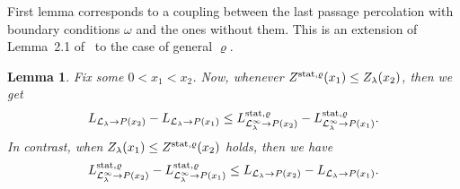 \documentclass[12pt,a4paper]{article}
\numberwithin{equation}{section}
\newtheorem{lem}[prop]{Lemma}
\begin{document}
First lemma corresponds to a coupling between the last passage percolation with boundary conditions $\omega$ and the ones without them. This is an extension of Lemma~2.1 of~\cite{Pi17} to the case of general $\varrho$.
\begin{lem}\label{CouplingLemma}
Fix some $0<x_1<x_2$. Now, whenever $Z^{{\rm stat},\varrho}(x_1)\leq Z_\lambda(x_2)$, then we get
\begin{align}\label{eq:UpsideCoupling}
L_{{\cal L}_{\lambda}\to P(x_2)} - L_{{\cal L}_{\lambda}\to P(x_1)}\leq L^{{\rm stat},\varrho}_{{\cal L}_{\lambda}^\infty \to P(x_2)} - L^{{\rm stat},\varrho}_{{\cal L}_{\lambda}^\infty\to P(x_1)}.
\end{align}
In contrast, when $Z_{\lambda}(x_1)\leq Z^{{\rm stat},\varrho}(x_2)$ holds, then we have
\begin{align}\label{eq:DownsideCoupling}
 L^{{\rm stat},\varrho}_{{\cal L}_{\lambda}^\infty \to P(x_2)} - L^{{\rm stat},\varrho}_{{\cal L}_{\lambda}^\infty\to P(x_1)}\leq L_{{\cal L}_{\lambda}\to P(x_2)} - L_{{\cal L}_{\lambda}\to P(x_1)}.
\end{align}
\end{lem}
\end{document}
